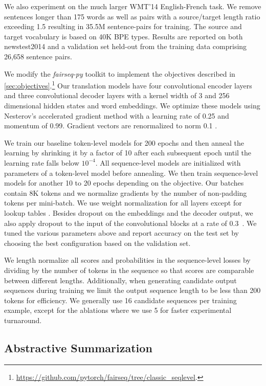 \documentclass[11pt,a4paper]{article}
\begin{document}
We also experiment on the much larger WMT'14 English-French task. 
We remove sentences longer than 175 words as well as pairs with a source/target length ratio exceeding 1.5 resulting in 35.5M sentence-pairs for training.
The source and target vocabulary is based on 40K BPE types.
Results are reported on both newstest2014 and a validation set held-out from the training data comprising 26,658 sentence pairs.

We modify the \emph{fairseq-py} toolkit to implement the objectives described in \textsection\ref{sec:objectives}.\footnote{\url{https://github.com/pytorch/fairseq/tree/classic_seqlevel}.}
Our translation models have four convolutional encoder layers and three convolutional decoder layers with a kernel width of 3 and 256 dimensional hidden states and word embeddings.
We optimize these models using Nesterov's accelerated gradient method \citep{sutskever2013icml} with a learning rate of 0.25 and momentum of 0.99.
  Gradient vectors are renormalized to norm 0.1 \citep{pascanu2013difficulty}.

We train our baseline token-level models for 200 epochs and then anneal the learning by shrinking it by a factor of 10 after each subsequent epoch until the learning rate falls below $10^{-4}$.
All sequence-level models are initialized with parameters of a token-level model before annealing.
We then train sequence-level models for another 10 to 20 epochs depending on the objective.
Our batches contain 8K tokens and we normalize gradients by the number of non-padding tokens per mini-batch.
We use weight normalization for all layers except for lookup tables \citep{salimans2016weight}.
Besides dropout on the embeddings and the decoder output, we also apply dropout to the input of the convolutional blocks at a rate of 0.3~\citep{srivastava2014dropout}.
We tuned the various parameters above and report accuracy on the test set by choosing the best configuration based on the validation set.

We length normalize all scores and probabilities in the sequence-level losses by dividing by the number of tokens in the sequence so that scores are comparable between different lengths.
Additionally, when generating candidate output sequences during training we limit the output sequence length to be less than 200 tokens for efficiency.
We generally use 16 candidate sequences per training example, except for the ablations where we use 5 for faster experimental turnaround.


\subsection{Abstractive Summarization}
\label{sec:expsetup_summary}
\end{document}
